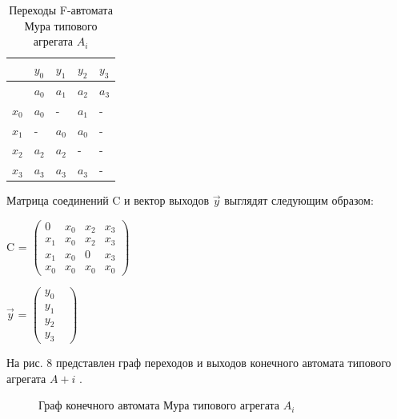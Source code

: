 \documentclass[12pt]{article}
\begin{document}
\begin{table}
\caption{Переходы F-автомата Мура типового агрегата ${A_i}$}
\center
\begin{tabular}{ || l | l | l | l | l || }

\hline
 & ${y_0}$ & ${y_1}$ & ${y_2}$ & ${y_3}$ \\ \hline
  & ${a_0}$ & ${a_1}$ & ${a_2}$ & ${a_3}$ \\ \hline
 ${x_0}$&${a_0}$ & - & ${a_1}$ & - \\ \hline
${x_1}$&- & ${a_0}$ & ${a_0}$ & -  \\ \hline
${x_2}$&${a_2}$ & ${a_2}$ & - &  -\\ \hline
${x_3}$&${a_3}$ & ${a_3}$ & ${a_3}$& - \\ \hline
\hline
\end{tabular}
\end{table}

Матрица соединений C и вектор выходов $\overrightarrow{y}$
 выглядят следующим образом:


C =
$\begin{pmatrix}
 0 & x_{0} & x_{2} & x_{3} \\
x_{1} & x_{0} &  x_{2} &  x_{3} \\
x_{1} &  x_{0} & 0 &  x_{3} \\
x_{0} &  x_{0} &  x_{0} &  x_{0} 
\end{pmatrix}$

$\overrightarrow{y}$ =
$\begin{pmatrix}
 y_{0} &  \\
y_{1}  \\
y_{2}  \\
y_{3}  
\end{pmatrix}$

На рис. 8 представлен граф переходов и выходов конечного автомата типового агрегата ${A+i}$ .

\begin{figure}
\caption{Граф конечного автомата Мура
типового агрегата ${A_i}$}
\end{figure}
\end{document}
